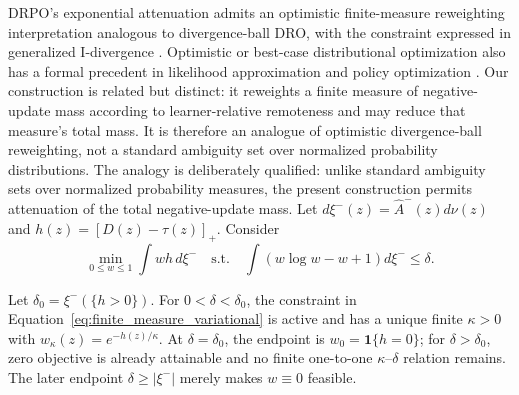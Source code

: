 \documentclass[sigconf,anonymous,review]{acmart}
\theoremstyle{acmdefinition}
\begin{document}
DRPO's exponential attenuation admits an optimistic finite-measure
reweighting interpretation analogous to divergence-ball DRO, with the
constraint expressed in generalized I-divergence
\citep{csiszar1975divergence}. Optimistic or best-case distributional
optimization also has a formal precedent in likelihood approximation
and policy optimization
\citep{nguyen2019optimistic,song2020optimistic}. Our construction is
related but distinct: it reweights a finite measure of negative-update
mass according to learner-relative remoteness and may reduce that
measure's total mass. It is therefore an analogue of optimistic
divergence-ball reweighting, not a standard ambiguity set over normalized
probability distributions. The analogy is deliberately qualified: unlike
standard ambiguity sets over normalized probability measures, the present
construction permits attenuation of the total negative-update mass. Let
\(d\xi^-(z)=\widehat A^-(z)d\nu(z)\) and
\(h(z)=[D(z)-\tau(z)]_+\). Consider
\begin{equation}
\min_{0\le w\le1}\int wh\,d\xi^-
\quad\mathrm{s.t.}\quad
\int(w\log w-w+1)d\xi^-\le\delta.
\label{eq:finite_measure_variational}
\end{equation}

\begin{proposition}
\label{prop:finite_measure_variational}
Let \(\delta_0=\xi^-(\{h>0\})\). For
\(0<\delta<\delta_0\), the constraint in
Equation~\eqref{eq:finite_measure_variational} is active and has a unique
finite \(\kappa>0\) with
\(w_\kappa(z)=e^{-h(z)/\kappa}\). At \(\delta=\delta_0\), the endpoint is
\(w_0=\mathbf1\{h=0\}\); for \(\delta>\delta_0\), zero objective is
already attainable and no finite one-to-one \(\kappa\)--\(\delta\)
relation remains. The later endpoint \(\delta\ge|\xi^-|\) merely makes
\(w\equiv0\) feasible.
\end{proposition}
\end{document}
